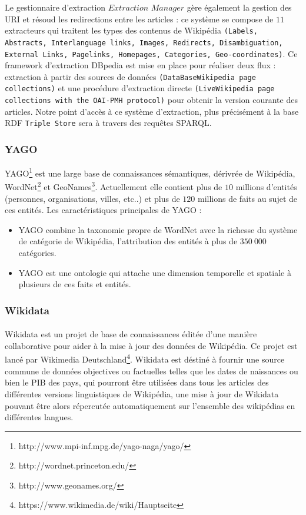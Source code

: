 Le gestionnaire d'extraction $Extraction$ $Manager$ gère également la gestion des URI et résoud les redirections entre les articles : ce système se compose de $11$ extracteurs qui traitent les types des contenus de Wikipédia {\tt(Labels, Abstracts, Interlanguage links, Images, Redirects, Disambiguation,
External Links, Pagelinks, Homepages, Categories, Geo-coordinates)}.
Ce framework d'extraction DBpedia est mise en place pour réaliser deux flux : extraction à partir des sources de données {\tt(DataBaseWikipedia page collections)} et une procédure d'extraction directe
{\tt(LiveWikipedia page collections with the OAI-PMH protocol)} pour obtenir la version courante des articles. Notre point d'accès à ce système d'extraction, plus précisément à la base RDF {\tt Triple Store} sera à travers des requêtes SPARQL. 
\subsubsection{YAGO}
YAGO\footnote{http://www.mpi-inf.mpg.de/yago-naga/yago/} est une large base de connaissances sémantiques, dérivrée de Wikipédia, WordNet\footnote{http://wordnet.princeton.edu/} et GeoNames\footnote{http://www.geonames.org/}. Actuellement elle contient plus de $10$ millions d’entités (personnes, organisations, villes, etc..) et plus de $120$ millions de faits au sujet de ces entités.
\newline
Les caractéristiques principales de YAGO :
\begin{itemize}
\item YAGO combine la taxonomie propre de WordNet avec la richesse du système de catégorie de Wikipédia, l'attribution des entités à plus de $350~000$ catégories.
\item YAGO est une ontologie qui attache une dimension temporelle et spatiale à plusieurs de ces faits et entités.
\end{itemize}
\subsubsection{Wikidata}
\paragraph{}
Wikidata est un projet de base de connaissances éditée d'une manière collaborative pour aider à la mise à jour des données de Wikipédia. Ce projet est lancé par Wikimedia Deutschland\footnote{https://www.wikimedia.de/wiki/Hauptseite}. Wikidata est déstiné à fournir une source commune de données objectives ou factuelles telles que les dates de naissances ou bien le PIB des pays, qui pourront être utilisées dans tous les articles des différentes versions linguistiques de Wikipédia, une mise à jour de Wikidata  pouvant être alors répercutée automatiquement sur l'ensemble des wikipédias en différentes langues. 
